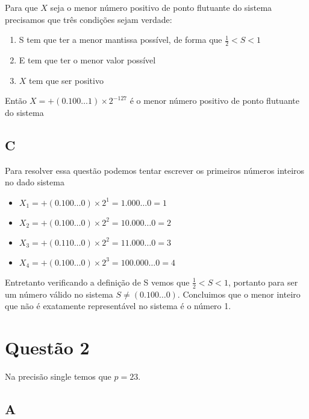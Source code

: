     Para que $X$ seja o menor número positivo de ponto flutuante do sistema precisamos que três condições sejam verdade:

    \begin{enumerate}
    \item{S tem que ter a menor mantissa possível, de forma que $\frac{1}{2} < S < 1$}
    \item{E tem que ter o menor valor possível}
    \item{$X$ tem que ser positivo}
    \end{enumerate}

      Então $X = +(0.100 \dots 1) \times 2^{-127}$ é o menor número positivo de ponto flutuante do sistema

  \subsection{C}

    Para resolver essa questão podemos tentar escrever os primeiros números inteiros no dado sistema

    \begin{itemize}
    \item{$X_1 = +(0.100 \dots 0) \times 2^{1} = 1.000 \dots 0 = 1$}
    \item{$X_2 = +(0.100 \dots 0) \times 2^{2} = 10.000 \dots 0 = 2$}
    \item{$X_3 = +(0.110 \dots 0) \times 2^{2} = 11.000 \dots 0 = 3$}
    \item{$X_4 = +(0.100 \dots 0) \times 2^{3} = 100.000 \dots 0 = 4$}
    \end{itemize}

    Entretanto verificando a definição de S vemos que $\frac{1}{2} < S < 1$, portanto para ser um número válido no sistema $S \neq (0.100 \dots 0)$. Concluimos que o menor inteiro que não é exatamente representável no sistema é o número 1.

  \section{Questão 2}
  \label{sec:question2}

    Na precisão single temos que $ p = 23$. \\
    \subsection{A}

